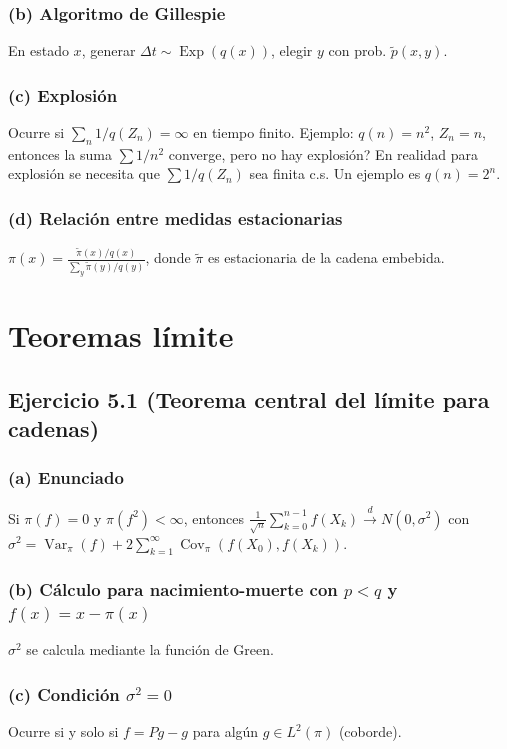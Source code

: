 \documentclass[letterpaper, 12pt]{article}
\newcommand{\1}{\mathbbm{1}}
\DeclareMathOperator{\Var}{Var}
\DeclareMathOperator{\Cov}{Cov}
\DeclareMathOperator{\Exp}{Exp}
\begin{document}
    \subsubsection*{(b) Algoritmo de Gillespie}
    En estado $x$, generar $\Delta t\sim\Exp(q(x))$, elegir $y$ con prob. $\tilde p(x,y)$.

    \subsubsection*{(c) Explosi\'on}
    Ocurre si $\sum_n 1/q(Z_n)=\infty$ en tiempo finito. Ejemplo: $q(n)=n^2$, $Z_n=n$, entonces la suma $\sum 1/n^2$ converge, pero no hay explosi\'on? En realidad para explosi\'on se necesita que $\sum 1/q(Z_n)$ sea finita c.s. Un ejemplo es $q(n)=2^n$.

    \subsubsection*{(d) Relaci\'on entre medidas estacionarias}
    $\pi(x)=\frac{\tilde\pi(x)/q(x)}{\sum_y\tilde\pi(y)/q(y)}$, donde $\tilde\pi$ es estacionaria de la cadena embebida.

    \section{Teoremas l\'imite}

    \subsection{Ejercicio 5.1 (Teorema central del l\'imite para cadenas)}

    \subsubsection*{(a) Enunciado}
    Si $\pi(f)=0$ y $\pi(f^2)<\infty$, entonces $\frac1{\sqrt{n}}\sum_{k=0}^{n-1}f(X_k)\xrightarrow{d}N(0,\sigma^2)$ con $\sigma^2=\Var_\pi(f)+2\sum_{k=1}^\infty\Cov_\pi(f(X_0),f(X_k))$.

    \subsubsection*{(b) C\'alculo para nacimiento-muerte con $p<q$ y $f(x)=x-\pi(x)$}
    $\sigma^2$ se calcula mediante la funci\'on de Green.

    \subsubsection*{(c) Condici\'on $\sigma^2=0$}
    Ocurre si y solo si $f=Pg-g$ para alg\'un $g\in L^2(\pi)$ (coborde).
\end{document}
